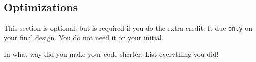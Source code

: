 \documentclass{article}
\begin{document}
\subsection*{Optimizations}
This section is optional, but is required if you do the extra credit. It due \texttt{only} on your final design. You do not need it on your initial. 

In what way did you make your code shorter. List everything you did!



\end{document}
